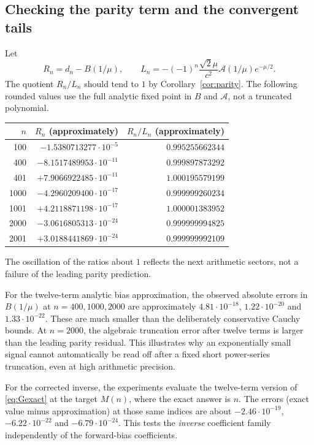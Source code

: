 \documentclass[11pt]{article}
\numberwithin{equation}{section}
\theoremstyle{definition}
\theoremstyle{remark}
\begin{document}
\subsection{Checking the parity term and the convergent tails}
Let
\[
 R_n=d_n-B(1/\mu),\qquad
 L_n=-(-1)^n\frac{\sqrt2\mu}{c^2}
                  \mathcal A(1/\mu)e^{-\mu/2}.
\]
The quotient $R_n/L_n$ should tend to $1$ by
Corollary~\ref{cor:parity}. The following rounded values use the full
analytic fixed point in $B$ and $\mathcal A$, not a truncated polynomial.
\begin{center}
\begin{tabular}{@{}r r r@{}}
\toprule
$n$ & $R_n$ (approximately) & $R_n/L_n$ (approximately)\\
\midrule
100 & $-1.5380713277\cdot10^{-5}$ & $0.995255662344$\\
400 & $-8.1517489953\cdot10^{-11}$ & $0.999897873292$\\
401 & $+7.9066922485\cdot10^{-11}$ & $1.000195579199$\\
1000 & $-4.2960209400\cdot10^{-17}$ & $0.999999260234$\\
1001 & $+4.2118871198\cdot10^{-17}$ & $1.000001383952$\\
2000 & $-3.0616805313\cdot10^{-24}$ & $0.999999994825$\\
2001 & $+3.0188441869\cdot10^{-24}$ & $0.999999992109$\\
\bottomrule
\end{tabular}
\end{center}
The oscillation of the ratios about $1$ reflects the next arithmetic
sectors, not a failure of the leading parity prediction.

For the twelve-term analytic bias approximation, the observed absolute
errors in $B(1/\mu)$ at $n=400,1000,2000$ are approximately
$4.81\cdot10^{-18}$, $1.22\cdot10^{-20}$ and $1.33\cdot10^{-22}$.
These are much smaller than the deliberately conservative Cauchy bounds.
At $n=2000$, the algebraic truncation error after twelve terms is larger
than the leading parity residual. This illustrates why an exponentially
small signal cannot automatically be read off after a fixed short
power-series truncation, even at high arithmetic precision.

For the corrected inverse, the experiments evaluate the twelve-term
version of \eqref{eq:Gexact} at the target $M(n)$, where the exact answer
is $n$. The errors (exact value minus approximation) at those same indices are about
$-2.46\cdot10^{-19}$, $-6.22\cdot10^{-22}$ and
$-6.79\cdot10^{-24}$. This tests the \emph{inverse} coefficient family
independently of the forward-bias coefficients.
\end{document}
